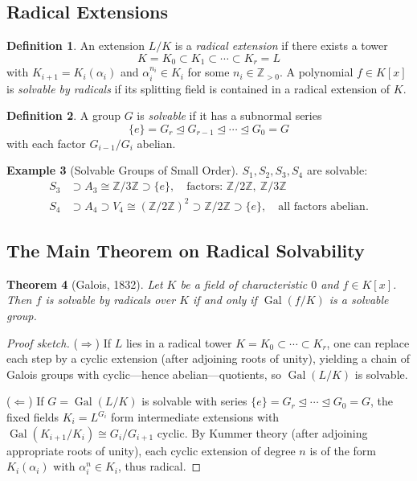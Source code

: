 \documentclass[12pt,a4paper]{amsart}
\newtheorem{theorem}{Theorem}[section]
\theoremstyle{definition}
\newtheorem{definition}[theorem]{Definition}
\newtheorem{example}[theorem]{Example}
\newcommand{\Z}{\mathbb{Z}}
\newcommand{\Gal}{\operatorname{Gal}}
\begin{document}
\subsection{Radical Extensions}

\begin{definition}
An extension $L/K$ is a \emph{radical extension} if there exists a tower
\[
  K = K_0 \subset K_1 \subset \cdots \subset K_r = L
\]
with $K_{i+1} = K_i(\alpha_i)$ and $\alpha_i^{n_i} \in K_i$ for some
$n_i \in \Z_{>0}$.
A polynomial $f \in K[x]$ is \emph{solvable by radicals} if its splitting
field is contained in a radical extension of $K$.
\end{definition}

\begin{definition}
A group $G$ is \emph{solvable} if it has a subnormal series
\[
  \{e\} = G_r \trianglelefteq G_{r-1} \trianglelefteq \cdots \trianglelefteq G_0 = G
\]
with each factor $G_{i-1}/G_i$ abelian.
\end{definition}

\begin{example}[Solvable Groups of Small Order]
$S_1, S_2, S_3, S_4$ are solvable:
\begin{align*}
  S_3 &\supset A_3 \cong \Z/3\Z \supset \{e\},
  \quad \text{factors: } \Z/2\Z,\ \Z/3\Z \\
  S_4 &\supset A_4 \supset V_4 \cong (\Z/2\Z)^2 \supset \Z/2\Z \supset \{e\},
  \quad \text{all factors abelian.}
\end{align*}
\end{example}

\subsection{The Main Theorem on Radical Solvability}

\begin{theorem}[Galois, 1832]
\label{thm:solvable}
Let $K$ be a field of characteristic $0$ and $f \in K[x]$. Then $f$ is
solvable by radicals over $K$ if and only if $\Gal(f/K)$ is a solvable group.
\end{theorem}

\begin{proof}[Proof sketch]
($\Rightarrow$) If $L$ lies in a radical tower $K = K_0 \subset \cdots \subset
K_r$, one can replace each step by a cyclic extension (after adjoining roots of
unity), yielding a chain of Galois groups with cyclic---hence abelian---quotients,
so $\Gal(L/K)$ is solvable.

($\Leftarrow$) If $G = \Gal(L/K)$ is solvable with series
$\{e\} = G_r \trianglelefteq \cdots \trianglelefteq G_0 = G$, the fixed fields
$K_i = L^{G_i}$ form intermediate extensions with
$\Gal(K_{i+1}/K_i) \cong G_i/G_{i+1}$ cyclic. By Kummer theory (after
adjoining appropriate roots of unity), each cyclic extension of degree $n$ is
of the form $K_i(\alpha_i)$ with $\alpha_i^n \in K_i$, thus radical.
\end{proof}
\end{document}

